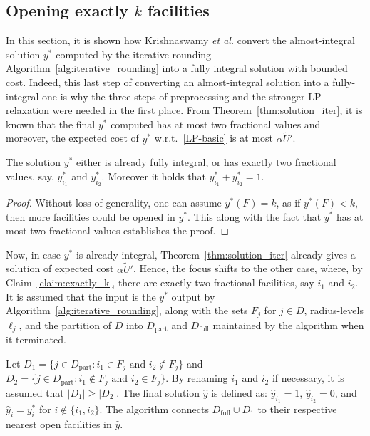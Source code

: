 \subsection{Opening exactly $k$ facilities}
In this section, it is shown how Krishnaswamy \emph{et al.} convert the almost-integral solution $y^*$ computed by the iterative rounding {Algorithm~\ref{alg:iterative_rounding}} into a fully integral solution with bounded cost. Indeed, this last step of converting an almost-integral solution into a fully-integral one is why the three steps of preprocessing and the stronger LP relaxation were needed in the first place. From Theorem~\ref{thm:solution_iter}, it is known that the final $y^*$ computed has at most two fractional values and moreover, the expected cost of $y^*$ w.r.t.~\eqref{LP-basic} is at most $\alpha \tilde{U}'$.

\begin{claim} \label{claim:exactly_k}
The solution $y^*$ either is already fully integral, or has exactly two fractional values, say, $y^*_{i_1}$ and $y^*_{i_2}$. Moreover it holds that $y^*_{i_1} + y^*_{i_2} = 1$.
\end{claim}

\begin{proof}
Without loss of generality, one can assume $y^*(F) = k$, as if $y^*(F) < k$, then more facilities could be opened in $y^*$. This along with the fact that $y^*$ has at most two fractional values establishes the proof.
\end{proof}

Now, in case $y^*$ is already integral, Theorem~\ref{thm:solution_iter} already gives a solution of expected cost $\alpha \tilde{U}'$. Hence, the focus shifts to the other case, where, by Claim~\ref{claim:exactly_k}, there are exactly two fractional facilities, say $i_1$ and $i_2$. It is assumed that the input is the $y^*$ output by Algorithm~\ref{alg:iterative_rounding}, along with the sets $F_j$ for $j \in D$, radius-levels $\ell_j$, and the partition of $D$ into $D_\text{part}$ and $D_\text{full}$ maintained by the algorithm when it terminated.

Let $D_1 = \{j \in D_\text{part} : i_1 \in F_j \text{ and } i_2 \notin F_j\}$ and $D_2 = \{j \in D_\text{part} : i_1 \notin F_j \text{ and } i_2 \in F_j\}$. By renaming $i_1$ and $i_2$ if necessary, it is assumed that $|D_1| \ge |D_2|$. The final solution $\hat{y}$ is defined as: $\hat{y}_{i_1} = 1$, $\hat{y}_{i_2} = 0$, and $\hat{y}_i = y^*_i$ for $i \notin \{i_1, i_2\}$. The algorithm connects $D_\text{full} \cup D_1$ to their respective nearest open facilities in $\hat{y}$.

